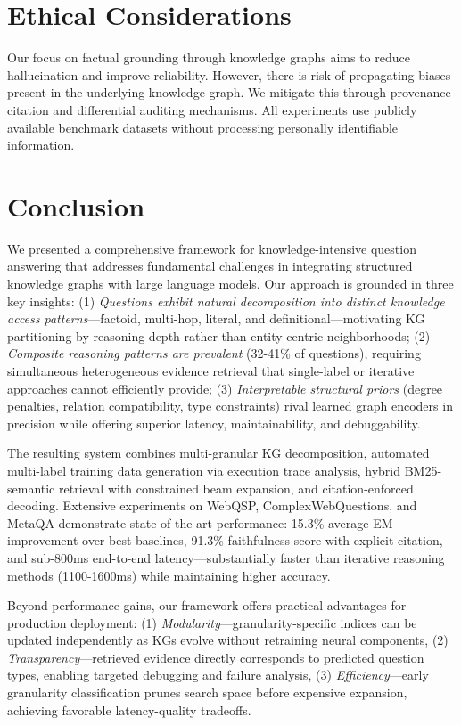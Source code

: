 \documentclass[conference]{IEEEtran}
\begin{document}
\section{Ethical Considerations}

Our focus on factual grounding through knowledge graphs aims to reduce hallucination and improve reliability. However, there is risk of propagating biases present in the underlying knowledge graph. We mitigate this through provenance citation and differential auditing mechanisms. All experiments use publicly available benchmark datasets without processing personally identifiable information.

\section{Conclusion}

We presented a comprehensive framework for knowledge-intensive question answering that addresses fundamental challenges in integrating structured knowledge graphs with large language models. Our approach is grounded in three key insights: (1) \emph{Questions exhibit natural decomposition into distinct knowledge access patterns}—factoid, multi-hop, literal, and definitional—motivating KG partitioning by reasoning depth rather than entity-centric neighborhoods; (2) \emph{Composite reasoning patterns are prevalent} (32-41\% of questions), requiring simultaneous heterogeneous evidence retrieval that single-label or iterative approaches cannot efficiently provide; (3) \emph{Interpretable structural priors} (degree penalties, relation compatibility, type constraints) rival learned graph encoders in precision while offering superior latency, maintainability, and debuggability.

The resulting system combines multi-granular KG decomposition, automated multi-label training data generation via execution trace analysis, hybrid BM25-semantic retrieval with constrained beam expansion, and citation-enforced decoding. Extensive experiments on WebQSP, ComplexWebQuestions, and MetaQA demonstrate state-of-the-art performance: 15.3\% average EM improvement over best baselines, 91.3\% faithfulness score with explicit citation, and sub-800ms end-to-end latency—substantially faster than iterative reasoning methods (1100-1600ms) while maintaining higher accuracy.

Beyond performance gains, our framework offers practical advantages for production deployment: (1) \emph{Modularity}—granularity-specific indices can be updated independently as KGs evolve without retraining neural components, (2) \emph{Transparency}—retrieved evidence directly corresponds to predicted question types, enabling targeted debugging and failure analysis, (3) \emph{Efficiency}—early granularity classification prunes search space before expensive expansion, achieving favorable latency-quality tradeoffs.
\end{document}
